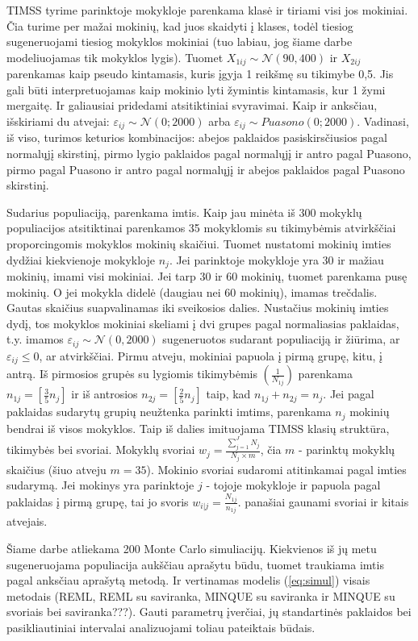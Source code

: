 \documentclass[12pt,a4paper]{article}
\begin{document}
\indent TIMSS tyrime parinktoje mokykloje parenkama klasė ir tiriami visi jos mokiniai. Čia turime per mažai mokinių, kad juos skaidyti į klases, todėl tiesiog sugeneruojami tiesiog mokyklos mokiniai (tuo labiau, jog šiame darbe modeliuojamas tik mokyklos lygis). Tuomet $X_{1ij}\sim \mathcal{N}(90, 400)$ ir $X_{2ij}$ parenkamas kaip pseudo kintamasis, kuris įgyja 1 reikšmę su tikimybe 0,5. Jis gali būti interpretuojamas kaip mokinio lyti žymintis kintamasis, kur 1 žymi mergaitę. Ir galiausiai pridedami atsitiktiniai svyravimai. Kaip ir anksčiau, išskiriami du atvejai: $\varepsilon_{ij}\sim \mathcal{N}(0; 2000)$ arba $\varepsilon_{ij}\sim Puasono(0; 2000)$. Vadinasi, iš viso, turimos keturios kombinacijos: abejos paklaidos pasiskirsčiusios pagal normalųjį skirstinį, pirmo lygio paklaidos pagal normalųjį ir antro pagal Puasono, pirmo pagal Puasono ir antro pagal normalųjį ir abejos paklaidos pagal Puasono skirstinį.

\indent Sudarius populiaciją, parenkama imtis. Kaip jau minėta iš 300 mokyklų populiacijos atsitiktinai parenkamos 35 mokyklomis su tikimybėmis atvirkščiai proporcingomis mokyklos mokinių skaičiui. Tuomet nustatomi mokinių imties dydžiai kiekvienoje mokykloje $n_j$. Jei parinktoje mokykloje yra 30 ir mažiau mokinių, imami visi mokiniai. Jei tarp 30 ir 60 mokinių, tuomet parenkama pusę mokinių. O jei mokykla didelė (daugiau nei 60 mokinių), imamas trečdalis. Gautas skaičius suapvalinamas iki sveikosios dalies. Nustačius mokinių imties dydį, tos mokyklos mokiniai skeliami į dvi grupes pagal normaliasias paklaidas, t.y. imamos $\varepsilon_{ij}\sim\mathcal{N}(0,2000)$ sugeneruotos sudarant populiaciją ir žiūrima, ar $\varepsilon_{ij} \le 0$, ar atvirkščiai. Pirmu atveju, mokiniai papuola į pirmą grupę, kitu, į antrą. Iš pirmosios grupės su lygiomis tikimybėmis $\left(\frac{1}{N_{1j}}\right)$ parenkama $n_{1j}=\left[\frac{3}{5}n_j\right]$ ir iš antrosios $n_{2j}=\left[\frac{2}{5}n_j\right]$ taip, kad $n_{1j}+n_{2j}=n_j$. Jei pagal paklaidas sudarytų grupių neužtenka parinkti imtims, parenkama $n_j$ mokinių bendrai iš visos mokyklos. Taip iš dalies imituojama TIMSS klasių struktūra, tikimybės bei svoriai. Mokyklų svoriai $w_j=\frac{\sum^J_{j=1}N_j}{N_j\times m}$, čia $m$ - parinktų mokyklų skaičius (šiuo atveju $m=35$). Mokinio svoriai sudaromi atitinkamai pagal imties sudarymą. Jei mokinys yra parinktoje $j$ - tojoje mokykloje ir papuola pagal paklaidas į pirmą grupę, tai jo svoris $w_{i|j}=\frac{N_{1j}}{n_{1j}}$. panašiai gaunami svoriai ir kitais atvejais.

\indent Šiame darbe atliekama 200 Monte Carlo simuliacijų. Kiekvienos iš jų metu sugeneruojama populiacija aukščiau aprašytu būdu, tuomet traukiama imtis pagal anksčiau aprašytą metodą. Ir vertinamas modelis (\ref{eq:simul}) visais metodais (REML, REML su saviranka, MINQUE su saviranka ir MINQUE su svoriais bei saviranka???). Gauti parametrų įverčiai, jų standartinės paklaidos bei pasikliautiniai intervalai analizuojami toliau pateiktais būdais.
\end{document}
